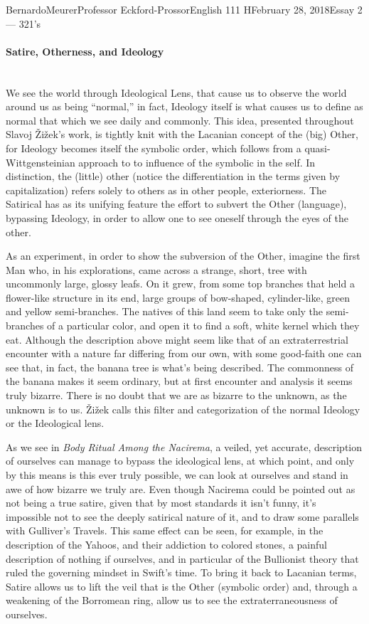 \documentclass[12pt,letterpaper]{article}
\begin{document}
\begin{mla}{Bernardo}{Meurer}{Professor Eckford-Prossor}{English 111 H}{February 28, 2018}{Essay 2 --- 321's}
    \paragraph*{Satire, Otherness, and Ideology}  \hspace{0pt} \\
    We see the world through Ideological Lens, that cause us to observe the world around us as being ``normal,'' in fact, Ideology itself is what causes us to define as normal that which we see daily and commonly. This idea, presented throughout Slavoj Žižek's work, is tightly knit with the Lacanian concept of the (big) Other, for Ideology becomes itself the symbolic order, which follows from a quasi-Wittgensteinian approach to to influence of the symbolic in the self. In distinction, the (little) other (notice the differentiation in the terms given by capitalization) refers solely to others as in other people, exteriorness. The Satirical has as its unifying feature the effort to subvert the Other (language), bypassing Ideology, in order to allow one to see oneself through the eyes of the other.

    As an experiment, in order to show the subversion of the Other, imagine the first Man who, in his explorations, came across a strange, short, tree with uncommonly large, glossy leafs. On it grew, from some top branches that held a flower-like structure in its end, large groups of bow-shaped, cylinder-like, green and yellow semi-branches. The natives of this land seem to take only the semi-branches of a particular color, and open it to find a soft, white kernel which they eat. Although the description above might seem like that of an extraterrestrial encounter with a nature far differing from our own, with some good-faith one can see that, in fact, the banana tree is what's being described. The commonness of the banana makes it seem ordinary, but at first encounter and analysis it seems truly bizarre. There is no doubt that we are as bizarre to the unknown, as the unknown is to us. Žižek calls this filter and categorization of the normal  Ideology or the Ideological lens.

    As we see in \textit{Body Ritual Among the Nacirema}, a veiled, yet accurate, description of ourselves can manage to bypass the ideological lens, at which point, and only by this means is this ever truly possible, we can look at ourselves and stand in awe of how bizarre we truly are. Even though Nacirema could be pointed out as not being a true satire, given that by most standards it isn't funny, it's impossible not to see the deeply satirical nature of it, and to draw some parallels with Gulliver's Travels. This same effect can be seen, for example, in the description of the Yahoos, and their addiction to colored stones, a painful description of nothing if ourselves, and in particular of the Bullionist theory that ruled the governing mindset in Swift's time. To bring it back to Lacanian terms, Satire allows us to lift the veil that is the Other (symbolic order) and, through a weakening of the Borromean ring, allow us to see the extraterraneousness of ourselves.


\end{mla}
\end{document}
